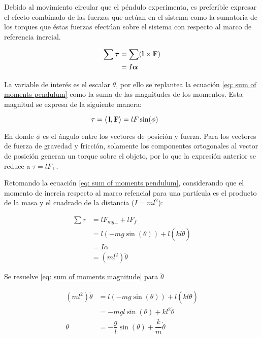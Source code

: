Debido al movimiento circular que el péndulo experimenta,
es preferible expresar el efecto combinado
de las fuerzas que actúan en el sistema como
la sumatoria de los torques que éstas fuerzas
efectúan sobre el sistema con respecto al marco de
referencia inercial.

\begin{equation}
 \begin{split}
  \sum\boldsymbol{\tau} & = \sum (\bold{l} \times \bold{F})\\
  & = I \boldsymbol{\alpha}
 \end{split}
 \label{eq: sum of moments pendulum}
\end{equation}

La variable de interés es el escalar $\theta$, por ello
se replantea la ecuación \eqref{eq: sum of moments pendulum}
como la suma de las magnitudes de los momentos.
Esta magnitud se expresa de la siguiente manera:

\begin{equation}
 \tau =  \langle \, \bold{l} , \bold{F}\rangle=  l F \sin(\phi) \qquad 
\end{equation}

En donde $\phi$ es el ángulo entre los vectores de posición y fuerza. 
Para los vectores de fuerza de gravedad y fricción,
solamente los componentes ortogonales al vector de posición generan
un torque sobre el objeto, por lo que la expresión anterior se reduce a 
$\tau = l F_\bot$.

Retomando la ecuación \eqref{eq: sum of moments pendulum}, considerando 
que el momento de inercia respecto al marco refencial para una partícula es 
el producto de la masa y el cuadrado de la distancia ($ I = m l^2$):

\begin{equation}
\begin{split}
 \sum \tau &= l F_{mg\bot}  + l F_f\\
 & = l (-m g \sin(\theta))  + l (k l \dot{\theta})\\
 & = I \alpha \\
 & = (m l^2) \ddot{\theta}
 \end{split}
 \label{eq: sum of moments magnitude}
\end{equation}

Se resuelve \eqref{eq: sum of moments magnitude} para $\ddot{\theta}$


\begin{equation}
\begin{split}
 (m l^2) \ddot{\theta} &= l (-m g \sin(\theta))  + l (k l \dot{\theta})\\
 &= - mgl \sin(\theta) + kl^2 \dot{\theta}\\
 \ddot{\theta} &= - \dfrac{g}{l} \sin(\theta) + \dfrac{k}{m} \dot{\theta}
\end{split}
 \label{eq: angular acceleraton newton}
\end{equation}


